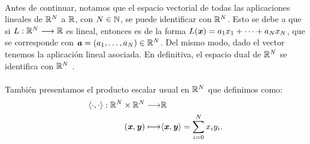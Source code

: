 \paragraph{}Antes de continuar, notamos que el espacio vectorial de todas las aplicaciones lineales de $ \mathbb{R}^N $ a $ \mathbb{R} $, con $ N \in \mathbb{N} $, se puede identificar con $ \mathbb{R}^N $. Esto se debe a que si $ L:\mathbb{R}^N \longrightarrow \mathbb{R} $ es lineal, entonces es de la forma $ L(\textbf{\emph{x}}) = a_1x_1 + \cdots + a_Nx_N $, que se corresponde con $ \textbf{\emph{a}} = (a_1,\dots,a_N) \in \mathbb{R}^N $. Del mismo modo, dado el vector tenemos la aplicación lineal asociada. En definitiva, el espacio dual de 
$ \mathbb{R}^N $ se identifica con $ \mathbb{R}^N $ .
\paragraph{} También presentamos el producto escalar usual en $ \mathbb{R}^N $ que definimos como:
\[
\begin{split}
\langle \cdot, \cdot \rangle : \mathbb{R}^N \times \mathbb{R}^N \longrightarrow &\mathbb{R} \\
(\textbf{\emph{x}}, \textbf{\emph{y}}) \longmapsto &\langle \textbf{\emph{x}}, \textbf{\emph{y}} \rangle = \sum_{i=0}^{N}x_iy_i.
\end{split}
\]

